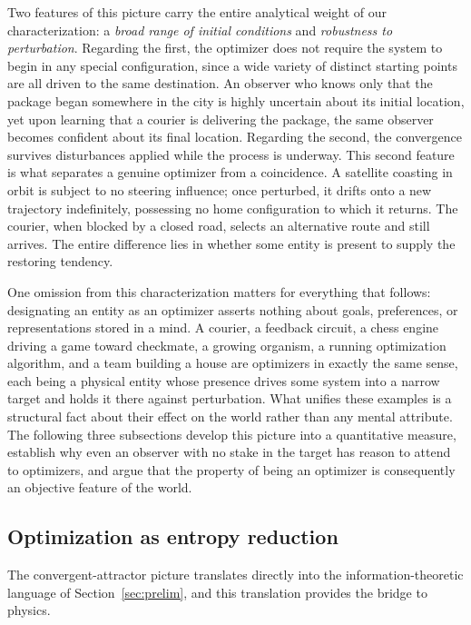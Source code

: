 \documentclass[10pt]{article}
\theoremstyle{definition}
\theoremstyle{remark}
\begin{document}
Two features of this picture carry the entire analytical weight of our characterization: a \emph{broad range of initial conditions} and \emph{robustness to perturbation}. Regarding the first, the optimizer does not require the system to begin in any special configuration, since a wide variety of distinct starting points are all driven to the same destination. An observer who knows only that the package began somewhere in the city is highly uncertain about its initial location, yet upon learning that a courier is delivering the package, the same observer becomes confident about its final location. Regarding the second, the convergence survives disturbances applied while the process is underway. This second feature is what separates a genuine optimizer from a coincidence. A satellite coasting in orbit is subject to no steering influence; once perturbed, it drifts onto a new trajectory indefinitely, possessing no home configuration to which it returns. The courier, when blocked by a closed road, selects an alternative route and still arrives. The entire difference lies in whether some entity is present to supply the restoring tendency.

One omission from this characterization matters for everything that follows: designating an entity as an optimizer asserts nothing about goals, preferences, or representations stored in a mind. A courier, a feedback circuit, a chess engine driving a game toward checkmate, a growing organism, a running optimization algorithm, and a team building a house are optimizers in exactly the same sense, each being a physical entity whose presence drives some system into a narrow target and holds it there against perturbation. What unifies these examples is a structural fact about their effect on the world rather than any mental attribute. The following three subsections develop this picture into a quantitative measure, establish why even an observer with no stake in the target has reason to attend to optimizers, and argue that the property of being an optimizer is consequently an objective feature of the world.

\subsection{Optimization as entropy reduction}
\label{sec:optentropy}

The convergent-attractor picture translates directly into the information-theoretic language of Section~\ref{sec:prelim}, and this translation provides the bridge to physics.
\end{document}
